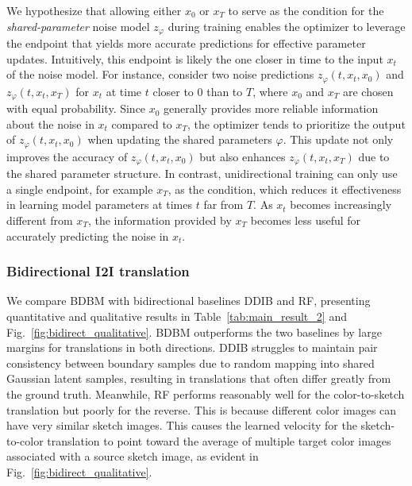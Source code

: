We hypothesize that allowing either $x_{0}$ or $x_{T}$ to serve
as the condition for the \emph{shared-parameter} noise model $z_{\varphi}$
during training enables the optimizer to leverage the endpoint that
yields more accurate predictions for effective parameter updates.
Intuitively, this endpoint is likely the one closer in time to the
input $x_{t}$ of the noise model. For instance, consider two noise
predictions $z_{\varphi}\left(t,x_{t},x_{0}\right)$ and $z_{\varphi}\left(t,x_{t},x_{T}\right)$
for $x_{t}$ at time $t$ closer to 0 than to $T$, where $x_{0}$
and $x_{T}$ are chosen with equal probability. Since $x_{0}$ generally
provides more reliable information about the noise in $x_{t}$ compared
to $x_{T}$, the optimizer tends to prioritize the output of $z_{\varphi}\left(t,x_{t},x_{0}\right)$
when updating the shared parameters $\varphi$. This update not only
improves the accuracy of $z_{\varphi}\left(t,x_{t},x_{0}\right)$
but also enhances $z_{\varphi}\left(t,x_{t},x_{T}\right)$ due to
the shared parameter structure. In contrast, unidirectional training
can only use a single endpoint, for example $x_{T}$, as the condition,
which reduces it effectiveness in learning model parameters at times
$t$ far from $T$. As $x_{t}$ becomes increasingly different from
$x_{T}$, the information provided by $x_{T}$ becomes less useful
for accurately predicting the noise in $x_{t}$.

\subsubsection{Bidirectional I2I translation\label{subsec:Bidirectional-I2I-Translation}}

We compare BDBM with bidirectional baselines DDIB and RF, presenting
quantitative and qualitative results in Table~\ref{tab:main_result_2}
and Fig.~\ref{fig:bidirect_qualitative}. BDBM outperforms the two
baselines by large margins for translations in both directions. DDIB
struggles to maintain pair consistency between boundary samples due
to random mapping into shared Gaussian latent samples, resulting in
translations that often differ greatly from the ground truth. Meanwhile,
RF performs reasonably well for the color-to-sketch translation but
poorly for the reverse. This is because different color images can
have very similar sketch images. This causes the learned velocity
for the sketch-to-color translation to point toward the average of
multiple target color images associated with a source sketch image,
as evident in Fig.~\ref{fig:bidirect_qualitative}.

